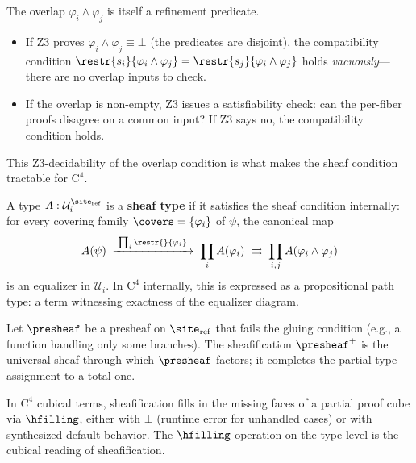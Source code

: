 \begin{remark}
The overlap $\varphi_i \wedge \varphi_j$ is itself a refinement predicate.
\begin{itemize}
\item If Z3 proves $\varphi_i \wedge \varphi_j \equiv \bot$
  (the predicates are disjoint), the compatibility condition
  $\restr{s_i}{\varphi_i \wedge \varphi_j} = \restr{s_j}{\varphi_i
  \wedge \varphi_j}$ holds \emph{vacuously}---there are no overlap inputs
  to check.
\item If the overlap is non-empty, Z3 issues a satisfiability check:
  can the per-fiber proofs disagree on a common input?  If Z3 says no,
  the compatibility condition holds.
\end{itemize}
This Z3-decidability of the overlap condition is what makes the sheaf
condition tractable for $\mathrm{C}^4$.
\end{remark}

\begin{definition}
\label{def:sheaf-type-c4}
A type $A : \mathcal{U}_i^{\site_{\mathrm{ref}}}$ is a \textbf{sheaf type}
if it satisfies the sheaf condition internally: for every covering family
$\covers = \{\varphi_i\}$ of $\psi$, the canonical map
\[
  A(\psi) \;\xrightarrow{\;\prod_i \restr{}{\varphi_i}\;}\;
  \prod_i A(\varphi_i)
  \;\rightrightarrows\;
  \prod_{i,j} A(\varphi_i \wedge \varphi_j)
\]
is an equalizer in $\mathcal{U}_i$.  In $\mathrm{C}^4$ internally, this
is expressed as a propositional path type: a term witnessing exactness of
the equalizer diagram.
\end{definition}

\begin{proposition}
\label{prop:sheafification-completion}
Let $\presheaf$ be a presheaf on $\site_{\mathrm{ref}}$ that fails the
gluing condition (e.g., a function handling only some branches).
The sheafification $\presheaf^+$ is the universal sheaf through which
$\presheaf$ factors; it completes the partial type assignment to a total one.

In $\mathrm{C}^4$ cubical terms, sheafification fills in the missing faces of
a partial proof cube via $\hfilling$, either with $\bot$ (runtime error for
unhandled cases) or with synthesized default behavior.  The $\hfilling$
operation on the type level is the cubical reading of sheafification.
\end{proposition}

